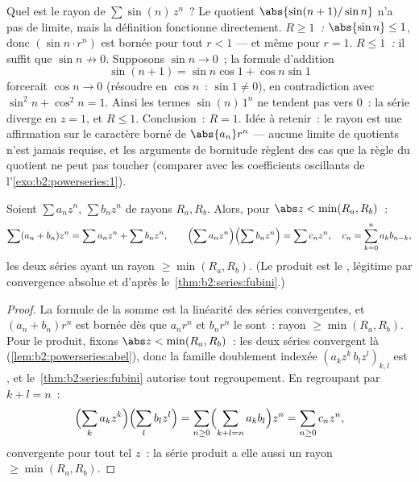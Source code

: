 \begin{example}\label{ex:b2:powerseries:sinn}
Quel est le rayon de $\sum \sin(n)\,z^n$~? Le quotient
$\abs{\sin(n+1)/\sin n}$ n'a pas de limite, mais la définition
fonctionne directement. \emph{$R \geq 1$~:} $\abs{\sin n} \leq 1$,
donc $(\sin n\cdot r^n)$ est bornée pour tout $r < 1$ --- et même
pour $r = 1$. \emph{$R \leq 1$~:} il suffit que $\sin n \not\to 0$.
Supposons $\sin n \to 0$~; la formule d'addition
\[
\sin(n+1) = \sin n\cos 1 + \cos n\sin 1
\]
forcerait $\cos n \to 0$ (résoudre en $\cos n$~: $\sin 1 \neq
0$), en contradiction avec $\sin^2 n + \cos^2 n = 1$. Ainsi les
termes $\sin(n)\,1^n$ ne tendent pas vers $0$~: la série diverge en
$z = 1$, et $R \leq 1$. Conclusion~: $R = 1$. Idée à retenir~: le
rayon est une affirmation sur le caractère borné de
$\abs{a_n}r^n$ --- aucune limite de quotients n'est jamais requise,
et les arguments de bornitude règlent des cas que la règle du
quotient ne peut pas toucher (comparer avec les coefficients
oscillants de l'\cref{exo:b2:powerseries:1}).
\end{example}

\begin{proposition}[Opérations]\label{prop:b2:powerseries:operations}
Soient $\sum a_nz^n$, $\sum b_nz^n$ de rayons $R_a, R_b$. Alors, pour
$\abs z < \min(R_a, R_b)$~:
\[
\sum (a_n + b_n)z^n = \sum a_nz^n + \sum b_nz^n,
\qquad
\Bigl(\sum a_nz^n\Bigr)\Bigl(\sum b_nz^n\Bigr) = \sum c_n z^n,
\quad c_n = \sum_{k=0}^{n} a_kb_{n-k},
\]
les deux séries ayant un rayon $\geq \min(R_a, R_b)$. (Le produit est
le , légitime par convergence absolue et
d'après le~\cref{thm:b2:series:fubini}.)
\end{proposition}

\begin{proof}
La formule de la somme est la linéarité des séries convergentes, et
$(a_n + b_n)r^n$ est bornée dès que $a_nr^n$ et $b_nr^n$ le
sont~: rayon $\geq \min(R_a, R_b)$. Pour le produit, fixons $\abs z
< \min(R_a, R_b)$~: les deux séries convergent \emph{}
là (\cref{lem:b2:powerseries:abel}), donc la famille doublement
indexée $(a_kz^k\,b_lz^l)_{k,l}$ est , et
le~\cref{thm:b2:series:fubini} autorise tout regroupement. En
regroupant par $k + l = n$~:
\[
\Bigl(\sum_k a_kz^k\Bigr)\Bigl(\sum_l b_lz^l\Bigr)
= \sum_{n\geq0}\Bigl(\sum_{k+l=n}a_kb_l\Bigr)z^n
= \sum_{n\geq0}c_nz^n ,
\]
 convergente pour tout tel $z$~: la série produit
a elle aussi un rayon $\geq \min(R_a, R_b)$.
\end{proof}

